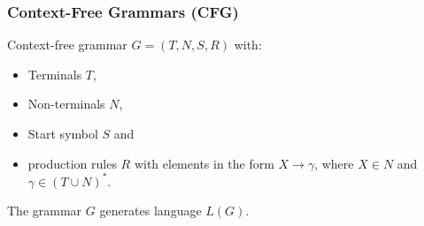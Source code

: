 			\subsubsection{Context-Free Grammars (CFG)} %
				Context-free grammar \( G = (T, N, S, R) \) with:
				\begin{itemize}
					\item Terminals \(T\),
					\item Non-terminals \(N\),
					\item Start symbol \(S\) and
					\item production rules \(R\) with elements in the form \( X \rightarrow \gamma \), where \( X \in N \) and \( \gamma \in (T \cup N)^* \).
				\end{itemize}
				The grammar \(G\) generates language \(L(G)\).

